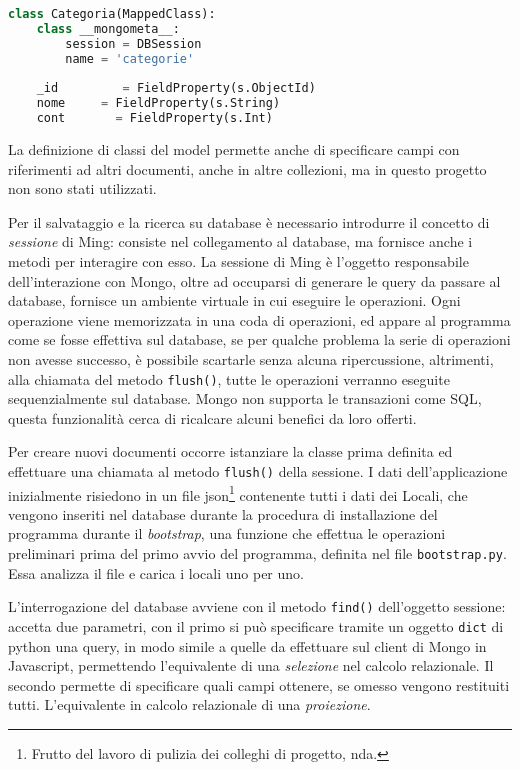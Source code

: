\begin{lstlisting}[label=ls:mingclass,caption={Classe della collezione di categorie, con i campi da salvare sul database.},language=Python]
class Categoria(MappedClass):
    class __mongometa__:
        session = DBSession
        name = 'categorie'
        
    _id         = FieldProperty(s.ObjectId)
    nome     = FieldProperty(s.String)
    cont       = FieldProperty(s.Int)
\end{lstlisting}

La definizione di classi del model permette anche di specificare campi con riferimenti ad altri documenti, anche in altre collezioni, ma in questo progetto non sono stati utilizzati.

Per il salvataggio e la ricerca su database è necessario introdurre il concetto di \emph{sessione} di Ming: consiste nel collegamento al database, ma fornisce anche i metodi per interagire con esso. La sessione di Ming è l'oggetto responsabile dell'interazione con Mongo, oltre ad occuparsi di generare le query da passare al database, fornisce un ambiente virtuale in cui eseguire le operazioni. Ogni operazione viene memorizzata in una coda di operazioni, ed appare al programma come se fosse effettiva sul database, se per qualche problema la serie di operazioni non avesse successo, è possibile scartarle senza alcuna ripercussione, altrimenti, alla chiamata del metodo \texttt{flush()}, tutte le operazioni verranno eseguite sequenzialmente sul database.  Mongo non supporta le transazioni come SQL, questa funzionalità cerca di ricalcare alcuni benefici da loro offerti.

Per creare nuovi documenti occorre istanziare la classe prima definita ed effettuare una chiamata al metodo \texttt{flush()} della sessione. I dati dell'applicazione inizialmente risiedono in un file json\footnote{Frutto del lavoro di pulizia dei colleghi di progetto, nda.} contenente tutti i dati dei Locali, che vengono inseriti nel database durante la procedura di installazione del programma durante il \emph{bootstrap}, una funzione che effettua le operazioni preliminari prima del primo avvio del programma, definita nel file \texttt{bootstrap.py}. Essa analizza il file e carica i locali uno per uno.

L'interrogazione del database avviene con il metodo \texttt{find()} dell'oggetto sessione: accetta due parametri, con il primo si può specificare tramite un oggetto \texttt{dict} di python una query, in modo simile a quelle da effettuare sul client di Mongo in Javascript, permettendo l'equivalente di una \emph{selezione} nel calcolo relazionale. Il secondo permette di specificare quali campi ottenere, se omesso vengono restituiti tutti. L'equivalente in calcolo relazionale di una \emph{proiezione}.


